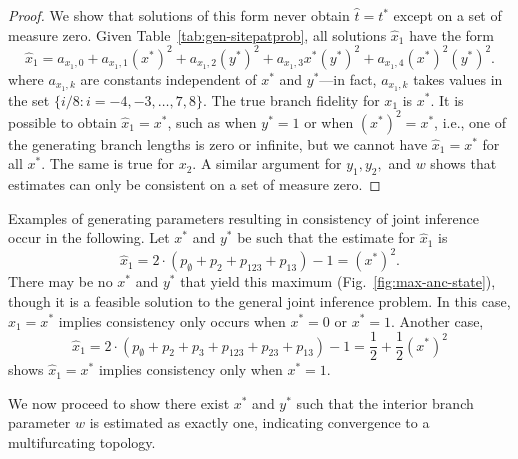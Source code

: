 \begin{proof}
We show that solutions of this form never obtain $\hat{t} = t^*$ except on a set of measure zero.
Given Table~\ref{tab:gen-sitepatprob}, all solutions $\hat{x}_1$ have the form
\[
\hat{x}_1 = a_{x_1,0} + a_{x_1,1}(x^*)^2 + a_{x_1,2}(y^*)^2 + a_{x_1,3} x^*(y^*)^2 + a_{x_1,4}(x^*)^2(y^*)^2.
\]
where $a_{x_1,k}$ are constants independent of $x^*$ and $y^*$---in fact, $a_{x_1,k}$ takes values in the set $\{i/8 : i=-4,-3,\ldots,7,8\}$.
The true branch fidelity for $x_1$ is $x^*$.
It is possible to obtain $\hat{x}_1=x^*$, such as when $y^*=1$ or when $(x^*)^2=x^*$, i.e., one of the generating branch lengths is zero or infinite, but we cannot have $\hat{x}_1=x^*$ for all $x^*$.
The same is true for $x_2$.
A similar argument for $y_1,y_2,$ and $w$ shows that estimates can only be consistent on a set of measure zero.
\end{proof}

Examples of generating parameters resulting in consistency of joint inference occur in the following.
Let $x^*$ and $y^*$ be such that the estimate for $\hat{x}_1$ is
\[
\hat{x}_1 = 2 \cdot \left(p_{\emptyset} + p_2 + p_{123} + p_{13}\right) - 1 = (x^*)^2.
\]
There may be no $x^*$ and $y^*$ that yield this maximum (Fig.~\ref{fig:max-anc-state}), though it is a feasible solution to the general joint inference problem.
In this case, $\hat{x}_1 = x^*$ implies consistency only occurs when $x^*=0$ or $x^*=1$.
Another case,
\[
\hat{x}_1 = 2 \cdot \left(p_{\emptyset} + p_2 + p_{3} + p_{123} + p_{23} + p_{13}\right) - 1 = \frac{1}{2} + \frac{1}{2}(x^*)^2
\]
shows $\hat{x}_1 = x^*$ implies consistency only when $x^*=1$.

We now proceed to show there exist $x^*$ and $y^*$ such that the interior branch parameter $w$ is estimated as exactly one, indicating convergence to a multifurcating topology.

\topoInconsist*

